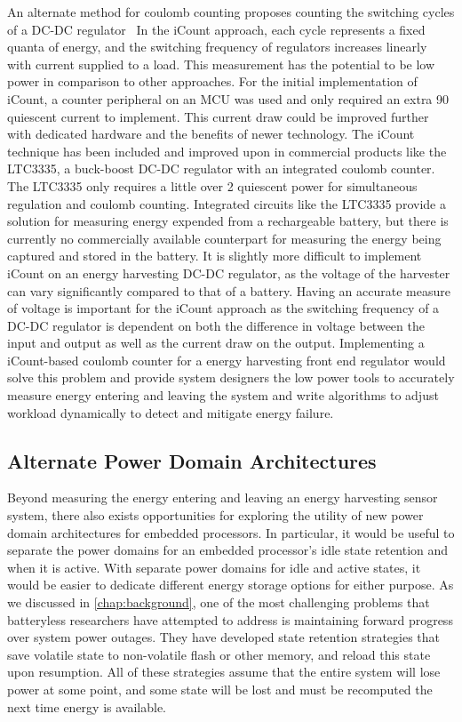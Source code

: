 An alternate method for coulomb counting proposes counting the switching cycles of a DC-DC regulator~\cite{duttaEnergy08} In the iCount approach, each cycle represents a fixed quanta of energy, and the switching frequency of regulators increases linearly with current supplied to a load.
This measurement has the potential to be low power in comparison to other approaches.
For the initial implementation of iCount, a counter peripheral on an MCU was used and only required an extra 90\ssi{\nano\ampere} quiescent current to implement. This current draw could be improved further with dedicated hardware and the benefits of newer technology.
The iCount technique has been included and improved upon in commercial products like the LTC3335, a buck-boost DC-DC regulator with an integrated coulomb counter.
The LTC3335 only requires a little over 2\ssi{\micro\watt} quiescent power for simultaneous regulation and coulomb counting.
Integrated circuits like the LTC3335 provide a solution for measuring energy expended from a rechargeable battery, but there is currently no commercially available counterpart for measuring the energy being captured and stored in the battery.
It is slightly more difficult to implement iCount on an energy harvesting DC-DC regulator, as the voltage of the harvester can vary significantly compared to that of a battery.
Having an accurate measure of voltage is important for the iCount approach as the switching frequency of a DC-DC regulator is dependent on both the difference in voltage between the input and output as well as the current draw on the output.
Implementing a iCount-based coulomb counter for a
energy harvesting front end regulator would solve this problem and provide system designers the low power tools to accurately measure energy entering and leaving the system and write algorithms to adjust workload dynamically to detect and mitigate energy failure.

\subsection{Alternate Power Domain Architectures}
Beyond measuring the energy entering and leaving an energy harvesting sensor system, there also exists opportunities for exploring the utility of new power domain architectures for embedded processors.
In particular, it would be useful to separate the power domains for an embedded processor's idle state retention and when it is active.
With separate power domains for idle and active states, it would be easier to dedicate different energy storage options for either purpose.
As we discussed in \cref{chap:background}, one of the most challenging problems that batteryless researchers have attempted to address is maintaining forward progress over system power outages.
They have developed state retention strategies that save volatile state to non-volatile flash or other memory, and reload this state upon resumption.
All of these strategies assume that the entire system will lose power at some point, and some state will be lost and must be recomputed the next time energy is available.

